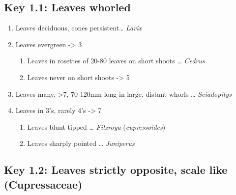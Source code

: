 \documentclass[openany]{book}
\providecommand{\tightlist}{%
  \setlength{\itemsep}{0pt}\setlength{\parskip}{0pt}}
\begin{document}
\hypertarget{key-1.1-leaves-whorled}{%
\subsection*{Key 1.1: Leaves whorled}\label{key-1.1-leaves-whorled}}

\begin{enumerate}
\def\labelenumi{\arabic{enumi}.}
\tightlist
\item
  Leaves deciduous, cones persistent\ldots{} \emph{Larix}
\item
  Leaves evergreen -\textgreater{} 3

  \begin{enumerate}
  \def\labelenumii{\arabic{enumii}.}
  \setcounter{enumii}{2}
  \tightlist
  \item
    Leaves in rosettes of 20-80 leaves on short shoots \ldots{} \emph{Cedrus}
  \item
    Leaves never on short shoots -\textgreater{} 5
  \end{enumerate}
\item
  Leaves many, \textgreater{}7, 70-120mm long in large, distant whorls \ldots{} \emph{Sciadopitys}
\item
  Leaves in 3's, rarely 4's -\textgreater{} 7

  \begin{enumerate}
  \def\labelenumii{\arabic{enumii}.}
  \setcounter{enumii}{6}
  \tightlist
  \item
    Leaves blunt tipped \ldots{} \emph{Fitzroya} (\emph{cupressoides})
  \item
    Leaves sharply pointed \ldots{} \emph{Juniperus}
  \end{enumerate}
\end{enumerate}

\hypertarget{key-1.2-leaves-strictly-opposite-scale-like-cupressaceae}{%
\subsection*{Key 1.2: Leaves strictly opposite, scale like (Cupressaceae)}\label{key-1.2-leaves-strictly-opposite-scale-like-cupressaceae}}
\end{document}
